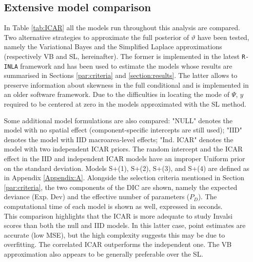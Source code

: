 \documentclass[openany]{book}
\begin{document}
\begin{appendices}

\section{Extensive model comparison} \label{Appendix:B}
In Table \ref{tab:ICAR} all the models run throughout this analysis are compared. Two alternative strategies to approximate the full posterior of $\vartheta$ have been tested, namely the Variational Bayes and the Simplified Laplace approximations (respectively VB and SL, hereinafter). The former is implemented in the latest \texttt{R-INLA} framework and has been used to estimate the models whose results are summarised in Sections \ref{par:criteria} and \ref{section:results}. The latter allows to preserve information about skewness in the full conditional and is implemented in an older software framework. Due to the difficulties in locating the mode of $\Psi$, $y$ required to be centered at zero in the models approximated with the SL method.

Some additional model formulations are also compared: "NULL" denotes the model with no spatial effect (component-specific intercepts are still used); "IID" denotes the model with IID macroarea-level effects; "Ind. ICAR" denotes the model with two independent ICAR priors. The random intercept and the ICAR effect in the IID and independent ICAR models have an improper Uniform prior on the standard deviation. Models  S+(1), S+(2), S+(3), and S+(4)  are defined as in Appendix \ref{Appendix:A}. Alongside the selection criteria mentioned in Section \ref{par:criteria}, the two components of the DIC are shown, namely the expected deviance (Exp. Dev) and the effective number of parameters ($P_D$). The computational time of each model is shown as well, expressed in seconds. \\

This comparison highlights that the ICAR is more adequate to study Invalsi scores than both the null and IID models. In this latter case, point estimates are accurate (low MSE), but the high complexity suggests this may be due to overfitting. The correlated ICAR outperforms the independent one. The VB approximation also appears to be generally preferable over the SL.

 
\begin{table}[ht]
\centering
{}
\end{table}
\end{appendices}
\end{document}
